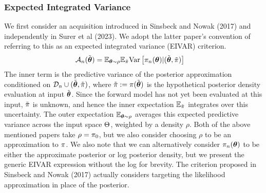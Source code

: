 \documentclass[12pt]{article}
\begin{document}
\subsubsection{Expected Integrated Variance}
We first consider an acquisition introduced in Sinsbeck and Nowak (2017) and independently 
in Surer et al (2023). We adopt the latter paper's convention of referring to this as an expected integrated variance (EIVAR) criterion. 
\begin{align}
\mathcal{A}_{n}(\tilde{\boldsymbol{\theta}}) &= \mathbb{E}_{\boldsymbol{\theta} \sim \rho} \mathbb{E}_{\tilde{\pi}} \mathrm{Var}\left[\pi_{n}(\boldsymbol{\theta}) | (\tilde{\boldsymbol{\theta}}, \tilde{\pi}) \right] \label{EIVAR}
\end{align}
The inner term is the predictive variance of the posterior approximation conditioned on $\mathcal{D}_{n} \cup (\tilde{\boldsymbol{\theta}}, \tilde{\pi})$, where 
$\tilde{\pi} := \pi(\tilde{\boldsymbol{\theta}})$ is the hypothetical posterior density evaluation at input $\tilde{\boldsymbol{\theta}}$. Since the forward model has not yet been evaluated at 
this input, $\tilde{\pi}$ is unknown, and hence the inner expectation $\mathbb{E}_{\tilde{\pi}}$ integrates over this uncertainty. The outer expectation $\mathbb{E}_{\boldsymbol{\theta} \sim \rho}$
averages this expected predictive variance across the input space $\Theta$, weighted by a density $\rho$. Both of the above mentioned papers take $\rho = \pi_0$, but we 
also consider choosing $\rho$ to be an approximation to $\pi$. We also note that we can alternatively consider $\pi_{n}(\boldsymbol{\theta})$ to be either the 
approximate posterior or log posterior density, but we present the generic EIVAR expression without the log for brevity. The criterion proposed in Sinsbeck and Nowak (2017) actually 
considers targeting the likelihood approximation in place of the posterior. 
\end{document}

